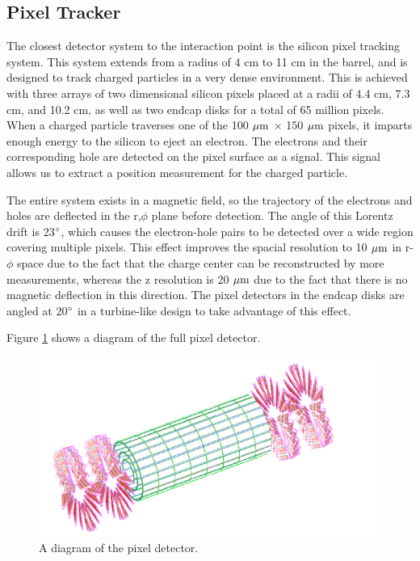 \subsection{Pixel Tracker}
The closest detector system to the interaction point is the silicon pixel tracking system.  
This system extends from a radius of 4 cm to 11 cm in the barrel, and is designed to track charged particles in a very dense environment.  
This is achieved with three arrays of two dimensional silicon pixels placed at a radii of 4.4 cm, 7.3 cm, and 10.2 cm, as well as two endcap disks for a total of 65 million pixels.  
When a charged particle traverses one of the 100 $\mum$ $\times$ 150 $\mum$ pixels, it imparts enough energy to the silicon to eject an electron.  
The electrons and their corresponding hole are detected on the pixel surface as a signal.  
This signal allows us to extract a position measurement for the charged particle.  

The entire system exists in a magnetic field, so the trajectory of the electrons and holes are deflected in the r,$\phi$ plane before detection.  
The angle of this Lorentz drift is 23$\textdegree$, which causes the electron-hole pairs to be detected over a wide region covering multiple pixels.  
This effect improves the spacial resolution to 10 $\mum$ in r-$\phi$ space due to the fact that the charge center can be reconstructed by more measurements, 
whereas the z resolution is 20 $\mum$ due to the fact that there is no magnetic deflection in this direction. 
The pixel detectors in the endcap disks are angled at 20$\textdegree$ in a turbine-like design to take advantage of this effect.  

Figure \ref{figs:CMSpixel} shows a diagram of the full pixel detector.    

\begin{figure}
\begin{center}
\includegraphics[width=1.0\linewidth]{figs/CMSpixel.png}
\caption{A diagram of the pixel detector.}
\label{figs:CMSpixel}
\end{center}
\end{figure}
  
